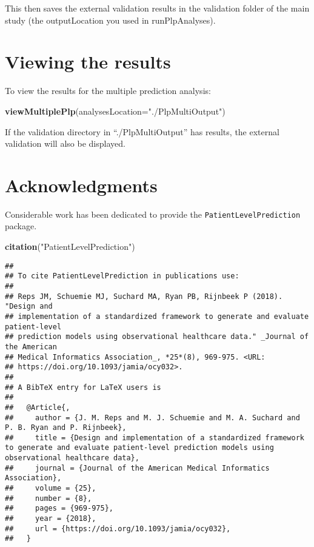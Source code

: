 \documentclass[
]{article}
\newenvironment{Shaded}{\begin{snugshade}}{\end{snugshade}}
\newcommand{\DataTypeTok}[1]{\textcolor[rgb]{0.13,0.29,0.53}{#1}}
\newcommand{\KeywordTok}[1]{\textcolor[rgb]{0.13,0.29,0.53}{\textbf{#1}}}
\newcommand{\NormalTok}[1]{#1}
\newcommand{\StringTok}[1]{\textcolor[rgb]{0.31,0.60,0.02}{#1}}
\begin{document}
This then saves the external validation results in the validation folder
of the main study (the outputLocation you used in runPlpAnalyses).

\hypertarget{viewing-the-results}{%
\section{Viewing the results}\label{viewing-the-results}}

To view the results for the multiple prediction analysis:

\begin{Shaded}
\begin{Highlighting}[]
\KeywordTok{viewMultiplePlp}\NormalTok{(}\DataTypeTok{analysesLocation=}\StringTok{"./PlpMultiOutput"}\NormalTok{)}
\end{Highlighting}
\end{Shaded}

If the validation directory in ``./PlpMultiOutput'' has results, the
external validation will also be displayed.

\hypertarget{acknowledgments}{%
\section{Acknowledgments}\label{acknowledgments}}

Considerable work has been dedicated to provide the
\texttt{PatientLevelPrediction} package.

\begin{Shaded}
\begin{Highlighting}[]
\KeywordTok{citation}\NormalTok{(}\StringTok{"PatientLevelPrediction"}\NormalTok{)}
\end{Highlighting}
\end{Shaded}

\begin{verbatim}
## 
## To cite PatientLevelPrediction in publications use:
## 
## Reps JM, Schuemie MJ, Suchard MA, Ryan PB, Rijnbeek P (2018). "Design and
## implementation of a standardized framework to generate and evaluate patient-level
## prediction models using observational healthcare data." _Journal of the American
## Medical Informatics Association_, *25*(8), 969-975. <URL:
## https://doi.org/10.1093/jamia/ocy032>.
## 
## A BibTeX entry for LaTeX users is
## 
##   @Article{,
##     author = {J. M. Reps and M. J. Schuemie and M. A. Suchard and P. B. Ryan and P. Rijnbeek},
##     title = {Design and implementation of a standardized framework to generate and evaluate patient-level prediction models using observational healthcare data},
##     journal = {Journal of the American Medical Informatics Association},
##     volume = {25},
##     number = {8},
##     pages = {969-975},
##     year = {2018},
##     url = {https://doi.org/10.1093/jamia/ocy032},
##   }
\end{verbatim}
\end{document}
